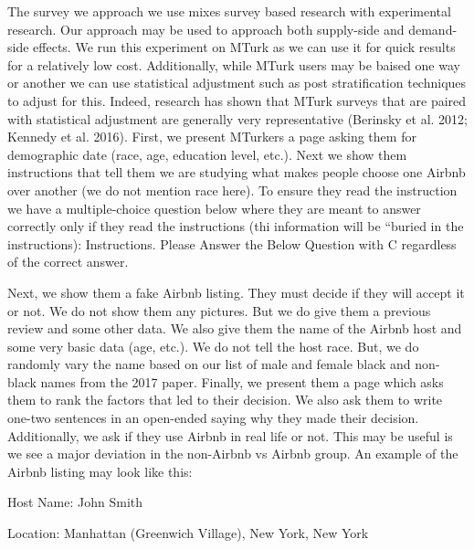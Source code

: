 \documentclass[dvips,12pt]{article}
\newcounter{choice}
\renewcommand\thechoice{\Alph{choice}}
\newcommand\choicelabel{\thechoice.}
\newenvironment{oneparchoices}%
  {%
    \setcounter{choice}{0}%
    \def\choice{%
      \refstepcounter{choice}%
      \ifnum\value{choice}>1\relax
        \penalty -50\hskip 1em plus 1em\relax
      \fi
      \choicelabel
      \nobreak\enskip
    }%
    \ifvmode\else\enskip\fi
    \ignorespaces
  }%
  {}
\begin{document}
The survey we approach we use mixes survey based research with experimental research. Our approach may be used to approach both supply-side and demand-side effects. We run this experiment on MTurk as we can use it for quick results for a relatively low cost. Additionally, while MTurk users may be baised one way or another we can use statistical adjustment such as post stratification techniques to adjust for this. Indeed, research has shown that MTurk surveys that are paired with statistical adjustment are generally very representative (Berinsky et al. 2012; Kennedy et al. 2016). First, we present MTurkers a page asking them for demographic date (race, age, education level, etc.). Next we show them instructions that tell them we are studying what makes people choose one Airbnb over another (we do not mention race here). To ensure they read the instruction we have a multiple-choice question below where they are meant to answer correctly only if they read the instructions (thi information will be “buried in the instructions):
\break\break
	Instructions. Please Answer the Below Question with C regardless of the correct answer.


Next, we show them a fake Airbnb listing. They must decide if they will accept it or not. We do not show them any pictures. But we do give them a previous review and some other data. We also give them the name of the Airbnb host and some very basic data (age, etc.). We do not tell the host race. But, we do randomly vary the name based on our list of male and female black and non-black names from the 2017 paper. Finally, we present them a page which asks them to rank the factors that led to their decision. We also ask them to write one-two sentences in an open-ended saying why they made their decision.  Additionally, we ask if they use Airbnb in real life or not. This may be useful is we see a major deviation in the non-Airbnb vs Airbnb group. 
\break
\break
An example of the Airbnb listing may look like this:
\vspace{10pt}

Host Name: John Smith

Location: Manhattan (Greenwich Village), New York, New York
\end{document}
